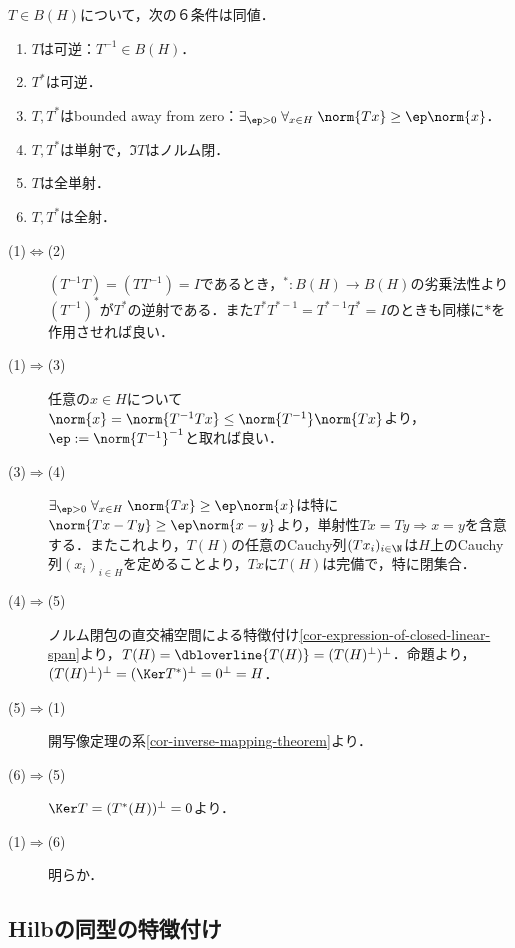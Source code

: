 \documentclass[uplatex,dvipdfmx]{jsreport}
\begin{document}
\begin{proposition}\label{prop-characterization-of-invertibleness-of-operator}
    $T\in B(H)$について，次の６条件は同値．
    \begin{enumerate}
        \item $T$は可逆：$T^{-1}\in B(H)$．
        \item $T^*$は可逆．
        \item $T,T^*$はbounded away from zero：$\exists_{\ep>0}\;\forall_{x\in H}\;\norm{Tx}\ge\ep\norm{x}$．%
        \item $T,T^*$は単射で，$\Im T$はノルム閉．
        \item $T$は全単射．
        \item $T,T^*$は全射．
    \end{enumerate}
\end{proposition}
\begin{Proof}\mbox{}
    \begin{description}
        \item[(1)$\Leftrightarrow$(2)] $(T^{-1}T)=(TT^{-1})=I$であるとき，${}^*:B(H)\to B(H)$の劣乗法性より$(T^{-1})^*$が$T^*$の逆射である．また$T^*T^{*-1}=T^{*-1}T^*=I$のときも同様に$*$を作用させれば良い．
        \item[(1)$\Rightarrow$(3)] 任意の$x\in H$について$\norm{x}=\norm{T^{-1}Tx}\le\norm{T^{-1}}\norm{Tx}$より，$\ep:=\norm{T^{-1}}^{-1}$と取れば良い．
        \item[(3)$\Rightarrow$(4)] $\exists_{\ep>0}\;\forall_{x\in H}\;\norm{Tx}\ge\ep\norm{x}$は特に$\norm{Tx-Ty}\ge\ep\norm{x-y}$より，単射性$Tx=Ty\Rightarrow x=y$を含意する．またこれより，$T(H)$の任意のCauchy列$(Tx_i)_{i\in\N}$は$H$上のCauchy列$(x_i)_{i\in H}$を定めることより，$Tx$に$T(H)$は完備で，特に閉集合．
        \item[(4)$\Rightarrow$(5)] ノルム閉包の直交補空間による特徴付け\ref{cor-expression-of-closed-linear-span}より，$T(H)=\dbloverline{T(H)}=(T(H)^\perp)^\perp$．命題より，$(T(H)^\perp)^\perp=(\Ker T^*)^\perp=0^\perp=H$．
        \item[(5)$\Rightarrow$(1)] 開写像定理の系\ref{cor-inverse-mapping-theorem}より．
        \item[(6)$\Rightarrow$(5)] $\Ker T=(T^*(H))^\perp=0$より．
        \item[(1)$\Rightarrow$(6)] 明らか．
    \end{description}
\end{Proof}

\subsection{Hilbの同型の特徴付け}
\end{document}
